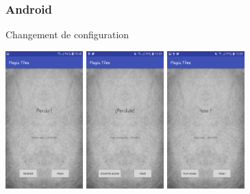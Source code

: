 \documentclass{beamer}
\begin{document}
\begin{frame}
\frametitle{Android}
\begin{block}{Changement de configuration}




    \begin{center}
      \includegraphics[width=30mm]{AndroidFin2}
      \includegraphics[width=30mm]{AndroidFin3}
      \includegraphics[width=30mm]{AndroidFin4}

    \end{center}

  
   \end{block}
\end{frame}

\end{document}
